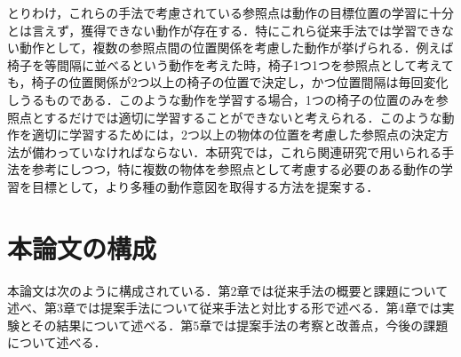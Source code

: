 とりわけ，これらの手法で考慮されている参照点は動作の目標位置の学習に十分とは言えず，獲得できない動作が存在する．特にこれら従来手法では学習できない動作として，複数の参照点間の位置関係を考慮した動作が挙げられる．例えば椅子を等間隔に並べるという動作を考えた時，椅子1つ1つを参照点として考えても，椅子の位置関係が2つ以上の椅子の位置で決定し，かつ位置間隔は毎回変化しうるものである．このような動作を学習する場合，1つの椅子の位置のみを参照点とするだけでは適切に学習することができないと考えられる．このような動作を適切に学習するためには，2つ以上の物体の位置を考慮した参照点の決定方法が備わっていなければならない．本研究では，これら関連研究で用いられる手法を参考にしつつ，特に複数の物体を参照点として考慮する必要のある動作の学習を目標として，より多種の動作意図を取得する方法を提案する．        

\section{本論文の構成}

本論文は次のように構成されている．第2章では従来手法の概要と課題について述べ、第3章では提案手法について従来手法と対比する形で述べる．第4章では実験とその結果について述べる．第5章では提案手法の考察と改善点，今後の課題について述べる．	
